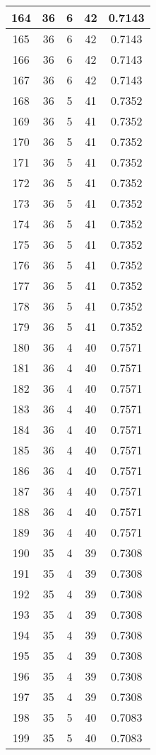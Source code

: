 \documentclass[letterpaper, 12pt]{article}
\begin{document}
\begin{longtable}{|c|c|c|c|c|}
\hline
164 & 36 & 6 & 42 & 0.7143 \\
\hline
165 & 36 & 6 & 42 & 0.7143 \\
\hline
166 & 36 & 6 & 42 & 0.7143 \\
\hline
167 & 36 & 6 & 42 & 0.7143 \\
\hline
168 & 36 & 5 & 41 & 0.7352 \\
\hline
169 & 36 & 5 & 41 & 0.7352 \\
\hline
170 & 36 & 5 & 41 & 0.7352 \\
\hline
171 & 36 & 5 & 41 & 0.7352 \\
\hline
172 & 36 & 5 & 41 & 0.7352 \\
\hline
173 & 36 & 5 & 41 & 0.7352 \\
\hline
174 & 36 & 5 & 41 & 0.7352 \\
\hline
175 & 36 & 5 & 41 & 0.7352 \\
\hline
176 & 36 & 5 & 41 & 0.7352 \\
\hline
177 & 36 & 5 & 41 & 0.7352 \\
\hline
178 & 36 & 5 & 41 & 0.7352 \\
\hline
179 & 36 & 5 & 41 & 0.7352 \\
\hline
180 & 36 & 4 & 40 & 0.7571 \\
\hline
181 & 36 & 4 & 40 & 0.7571 \\
\hline
182 & 36 & 4 & 40 & 0.7571 \\
\hline
183 & 36 & 4 & 40 & 0.7571 \\
\hline
184 & 36 & 4 & 40 & 0.7571 \\
\hline
185 & 36 & 4 & 40 & 0.7571 \\
\hline
186 & 36 & 4 & 40 & 0.7571 \\
\hline
187 & 36 & 4 & 40 & 0.7571 \\
\hline
188 & 36 & 4 & 40 & 0.7571 \\
\hline
189 & 36 & 4 & 40 & 0.7571 \\
\hline
190 & 35 & 4 & 39 & 0.7308 \\
\hline
191 & 35 & 4 & 39 & 0.7308 \\
\hline
192 & 35 & 4 & 39 & 0.7308 \\
\hline
193 & 35 & 4 & 39 & 0.7308 \\
\hline
194 & 35 & 4 & 39 & 0.7308 \\
\hline
195 & 35 & 4 & 39 & 0.7308 \\
\hline
196 & 35 & 4 & 39 & 0.7308 \\
\hline
197 & 35 & 4 & 39 & 0.7308 \\
\hline
198 & 35 & 5 & 40 & 0.7083 \\
\hline
199 & 35 & 5 & 40 & 0.7083 \\
\hline
\end{longtable}
\end{document}
